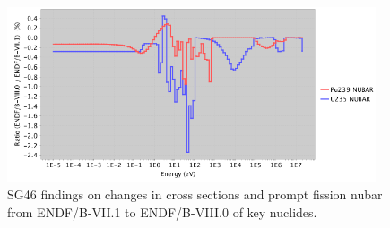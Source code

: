 \documentclass[letterpaper]{ar-1col}
\begin{document}
\begin{figure}
\begin{minipage}{0.5\textwidth}
    \end{minipage}\hfill
    \begin{minipage}{0.5\textwidth}
        \centering
        \includegraphics[width=0.97\textwidth]{pu239_2.png} %
    \end{minipage}
    \caption{SG46 findings on changes in cross sections and prompt fission nubar from ENDF/B-VII.1 to ENDF/B-VIII.0 of key nuclides. }
     \label{fig:ne_plots}
\end{figure}
\end{document}
